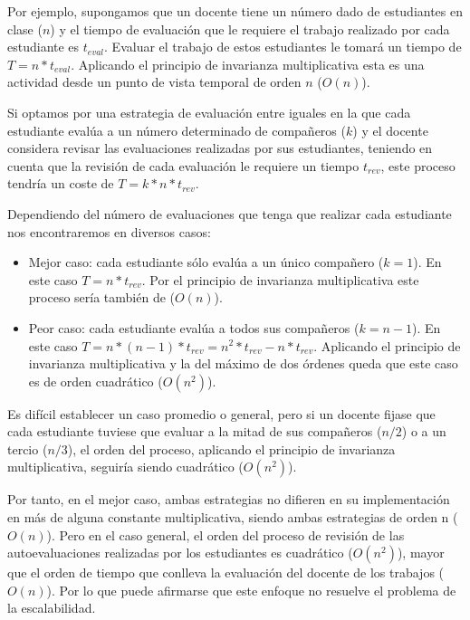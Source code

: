 Por ejemplo, supongamos que un docente tiene un número dado de estudiantes en clase ($n$) y el tiempo de evaluación que le requiere el trabajo realizado por cada estudiante es $t_{eval}$. Evaluar el trabajo de estos estudiantes le tomará un tiempo de $T = n*t_{eval}$. Aplicando el principio de invarianza multiplicativa esta es una actividad desde un punto de vista temporal de orden $n$ ($O(n)$). 

Si optamos por una estrategia de evaluación entre iguales en la que cada estudiante evalúa a un número determinado de compañeros ($k$) y el docente considera revisar las evaluaciones realizadas por sus estudiantes, teniendo en cuenta que la revisión de cada evaluación le requiere un tiempo $t_{rev}$, este proceso tendría un coste de $T = k*n*t_{rev}$.

Dependiendo del número de evaluaciones que tenga que realizar cada estudiante nos encontraremos en diversos casos:
\begin{itemize}
	\item Mejor caso: cada estudiante sólo evalúa a un único compañero ($k=1$). En este caso $T = n*t_{rev}$. Por el principio de invarianza multiplicativa este proceso sería también de ($O(n)$).
	\item Peor caso: cada estudiante evalúa a todos sus compañeros ($k = n - 1$). En este caso $T = n*(n-1)*t_{rev} = n^{2}*t_{rev} - n*t_{rev}$. Aplicando el principio de invarianza multiplicativa y la del máximo de dos órdenes queda que este caso es de orden cuadrático ($O(n^{2})$).
\end{itemize}

Es difícil establecer un caso promedio o general, pero si un docente fijase que cada estudiante tuviese que evaluar a la mitad de sus compañeros ($n/2$) o a un tercio ($n/3$), el orden del proceso, aplicando el principio de invarianza multiplicativa, seguiría siendo cuadrático ($O(n^{2})$).


Por tanto, en el mejor caso, ambas estrategias no difieren en su implementación en más de alguna constante multiplicativa, siendo ambas estrategias de orden n ($O(n)$). Pero en el caso general, el orden del proceso de revisión de las autoevaluaciones realizadas por los estudiantes es cuadrático ($O(n^{2})$), mayor que el orden de tiempo que conlleva la evaluación del docente de los trabajos ($O(n)$). Por lo que puede afirmarse que este enfoque no resuelve el problema de la escalabilidad.

